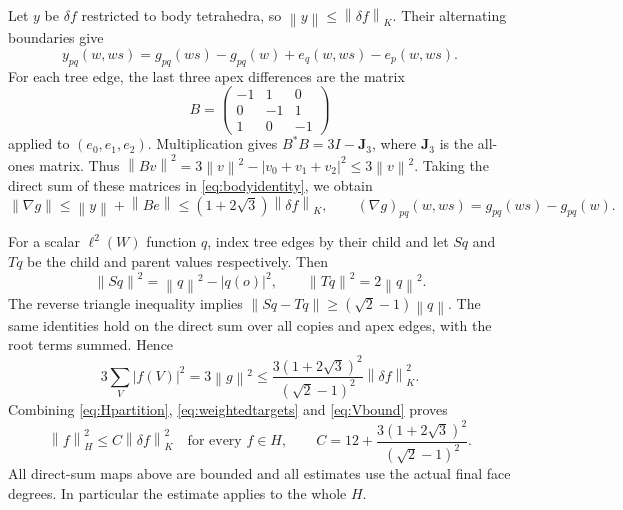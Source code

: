 \documentclass[11pt]{article}
\newcommand{\norm}[1]{\left\lVert#1\right\rVert}
\begin{document}
Let $y$ be $\delta f$ restricted to body tetrahedra, so
$\norm{y}\leq\norm{\delta f}_K$. Their alternating boundaries give
\begin{equation}\label{eq:bodyidentity}
 y_{pq}(w,ws)=g_{pq}(ws)-g_{pq}(w)+e_q(w,ws)-e_p(w,ws).
\end{equation}
For each tree edge, the last three apex differences are the matrix
\[
 B=\begin{pmatrix}-1&1&0\\0&-1&1\\1&0&-1\end{pmatrix}
\]
applied to $(e_0,e_1,e_2)$. Multiplication gives
$B^*B=3I-\mathbf{J}_3$, where $\mathbf{J}_3$ is the all-ones matrix. Thus
$\norm{Bv}^2=3\norm{v}^2-|v_0+v_1+v_2|^2\leq3\norm{v}^2$.
Taking the direct sum of these matrices in \eqref{eq:bodyidentity}, we obtain
\begin{equation}\label{eq:gradientupper}
 \norm{\nabla g}\leq\norm{y}+\norm{Be}
    \leq(1+2\sqrt3)\norm{\delta f}_K,
 \qquad (\nabla g)_{pq}(w,ws)=g_{pq}(ws)-g_{pq}(w).
\end{equation}

For a scalar $\ell^2(W)$ function $q$, index tree edges by their child and
let $Sq$ and $Tq$ be the child and parent values respectively. Then
\[
 \norm{Sq}^2=\norm{q}^2-|q(o)|^2,\qquad
 \norm{Tq}^2=2\norm{q}^2.
\]
The reverse triangle inequality implies
$\norm{Sq-Tq}\geq(\sqrt2-1)\norm{q}$. The same identities hold on the
direct sum over all copies and apex edges, with the root terms summed. Hence
\begin{equation}\label{eq:Vbound}
 3\sum_V|f(V)|^2=3\norm{g}^2
 \leq\frac{3(1+2\sqrt3)^2}{(\sqrt2-1)^2}\norm{\delta f}_K^2.
\end{equation}
Combining \eqref{eq:Hpartition}, \eqref{eq:weightedtargets} and
\eqref{eq:Vbound} proves
\begin{equation}\label{eq:coercivity}
 \norm{f}_H^2\leq C\norm{\delta f}_K^2\quad\text{for every }f\in H,
 \qquad C=12+\frac{3(1+2\sqrt3)^2}{(\sqrt2-1)^2}.
\end{equation}
All direct-sum maps above are bounded and all estimates use the actual final
face degrees. In particular the estimate applies to the whole $H$.
\end{document}

